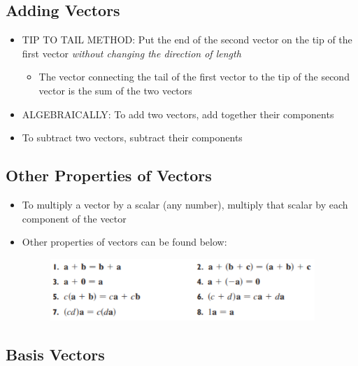 \documentclass{package/notes}
\begin{document}
\subsection{Adding Vectors}

\begin{itemize}
	\item TIP TO TAIL METHOD: Put the end of the second vector on the tip of the first vector \textit{without changing the direction of length}
	\begin{itemize}
		\item The vector connecting the tail of the first vector to the tip of the second vector is the sum of the two vectors
	\end{itemize}
	\item ALGEBRAICALLY: To add two vectors, add together their components
	\item To subtract two vectors, subtract their components
\end{itemize}

\subsection{Other Properties of Vectors}

\begin{itemize}
	\item To multiply a vector by a scalar (any number), multiply that scalar by each component of the vector
	\item Other properties of vectors can be found below: 
	
	\begin{figure}[h]
		\begin{center}
			\includegraphics[width=10cm]{images/1.2.1_Image.PNG}
		\end{center}
	\end{figure}
\end{itemize}

\subsection{Basis Vectors}
\end{document}
